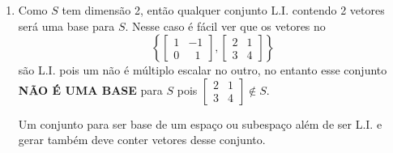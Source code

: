 \documentclass[12pt]{exam}
\begin{document}
\begin{enumerate}[label={\alph*})]
        \item Como $S$ tem dimensão 2, então qualquer conjunto L.I. contendo 2 vetores será uma base para $S$. Nesse caso é fácil ver que os vetores no
        \[
        \left\{
        \begin{bmatrix}
            1 & -1\\
            0 & \phantom{x} 1
        \end{bmatrix},
        \begin{bmatrix}
            2 & 1\\
            3 & 4
        \end{bmatrix}
        \right\}
        \]
        são L.I. pois um não é múltiplo escalar no outro, no entanto esse conjunto \textbf{NÃO É UMA BASE} para $S$ pois $ \begin{bmatrix}2 & 1\\3 & 4\end{bmatrix} \notin S$.

        Um conjunto para ser base de um espaço ou subespaço além de ser L.I. e gerar também deve conter vetores desse conjunto.
    \end{enumerate}
\end{document}
